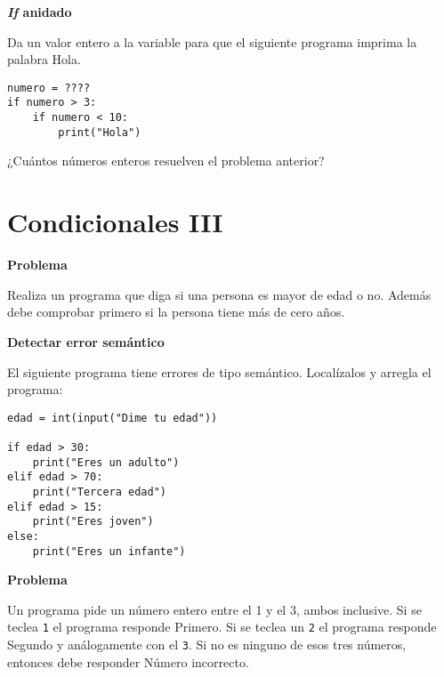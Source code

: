 \documentclass[a4paper, 11pt]{scrartcl}
\newenvironment{code}{\begin{tcolorbox}[colback=red!2!white]}{\end{tcolorbox}}
\begin{document}
\noindent\textbf{\sffamily \textit{If} anidado}

Da un valor entero a la variable para que el siguiente programa imprima la palabra \guillemotleft Hola\guillemotright.

\smallskip

\begin{code}

\begin{verbatim}
numero = ????
if numero > 3:
	if numero < 10:
		print("Hola")
\end{verbatim}

\end{code}


¿Cuántos números enteros resuelven el problema anterior?


\newpage

\section{Condicionales III}





\noindent\textbf{\sffamily Problema}

Realiza un programa que diga si una persona es mayor de edad o no. Además debe comprobar primero si la persona tiene más de cero años.





\noindent\textbf{\sffamily Detectar error semántico}

El siguiente programa tiene errores de tipo semántico. Localízalos y arregla el programa:

\smallskip


\begin{code}

\begin{verbatim}
edad = int(input("Dime tu edad"))

if edad > 30:
	print("Eres un adulto")
elif edad > 70:
	print("Tercera edad")
elif edad > 15:	
	print("Eres joven")
else:
	print("Eres un infante")
\end{verbatim}

\end{code}





\noindent\textbf{\sffamily Problema}

Un programa pide un número entero entre el 1 y el 3, ambos inclusive. Si se teclea \verb|1| el programa responde \guillemotleft Primero\guillemotright. Si se teclea un \verb|2| el programa responde \guillemotleft Segundo\guillemotright{} y análogamente con el \verb|3|. Si no es ninguno de esos tres números, entonces debe responder \guillemotleft Número incorrecto\guillemotright.
\end{document}
